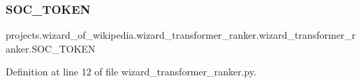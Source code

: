 \subsubsection{\texorpdfstring{S\+O\+C\+\_\+\+T\+O\+K\+EN}{SOC\_TOKEN}}
{\footnotesize\ttfamily projects.\+wizard\+\_\+of\+\_\+wikipedia.\+wizard\+\_\+transformer\+\_\+ranker.\+wizard\+\_\+transformer\+\_\+ranker.\+S\+O\+C\+\_\+\+T\+O\+K\+EN}



Definition at line 12 of file wizard\+\_\+transformer\+\_\+ranker.\+py.

